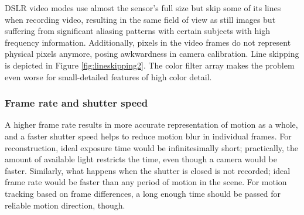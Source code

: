 
DSLR video modes use almost the sensor's full size but skip some of its lines when recording video, resulting in the same field of view as still images but suffering from significant aliasing patterns with certain subjects with high frequency information.
Additionally, pixels in the video frames do not represent physical pixels anymore, posing awkwardness in camera calibration.
Line skipping is depicted in Figure \ref{fig:lineskipping2}.
The color filter array makes the problem even worse for small-detailed features of high color detail.



\subsubsection{Frame rate and shutter speed} %


A higher frame rate results in more accurate representation of motion as a whole, and a faster shutter speed helps to reduce motion blur in individual frames.
For reconstruction, ideal exposure time would be infinitesimally short; practically, the amount of available light restricts the time, even though a camera would be faster.
Similarly, what happens when the shutter is closed is not recorded; ideal frame rate would be faster than any period of motion in the scene.
For motion tracking based on frame differences, a long enough time should be passed for reliable motion direction, though.

